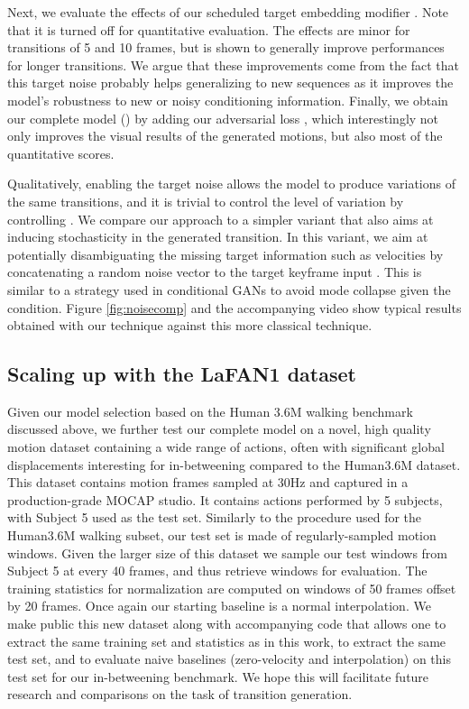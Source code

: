 \documentclass[acmtog]{acmart}
\begin{document}
Next, we evaluate the effects of our scheduled target embedding modifier . Note that it is turned off for quantitative evaluation. The effects are minor for transitions of 5 and 10 frames, but  is shown to generally improve performances for longer transitions. We argue that these improvements come from the fact that this target noise probably helps generalizing to new sequences as it improves the model's robustness to new or noisy conditioning information. Finally, we obtain our complete model () by adding our adversarial loss , which interestingly not only improves the visual results of the generated motions, but also most of the quantitative scores.

Qualitatively, enabling the target noise allows the model to produce variations of the same transitions, and it is trivial to control the level of variation by controlling . We compare our approach to a simpler variant that also aims at inducing stochasticity in the generated transition. In this variant, we aim at potentially disambiguating the missing target information such as velocities by concatenating a random noise vector  to the target keyframe input . This is similar to a strategy used in conditional GANs to avoid mode collapse given the condition. Figure \ref{fig:noisecomp} and the accompanying video show typical results obtained with our technique against this more classical technique. \subsection{Scaling up with the LaFAN1 dataset}\label{sec:biggerDataset}
Given our model selection based on the Human 3.6M walking benchmark discussed above, we further test our complete model on a novel, high quality motion dataset containing a wide range of actions, often with significant global displacements interesting for in-betweening compared to the Human3.6M dataset. This dataset contains  motion frames sampled at 30Hz and captured in a production-grade MOCAP studio. It contains actions performed by 5 subjects, with Subject 5 used as the test set. Similarly to the procedure used for the Human3.6M walking subset, our test set is made of regularly-sampled motion windows. Given the larger size of this dataset we sample our test windows from Subject 5 at every 40 frames, and thus retrieve  windows for evaluation. The training statistics for normalization are computed on windows of 50 frames offset by 20 frames. Once again our starting baseline is a normal interpolation. We make public this new dataset along with accompanying code that allows one to extract the same training set and statistics as in this work, to extract the same test set, and to evaluate naive baselines (zero-velocity and interpolation) on this test set for our in-betweening benchmark. We hope this will facilitate future research and comparisons on the task of transition generation.
\end{document}

